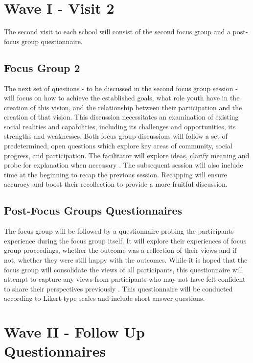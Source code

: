 \section{Wave I - Visit 2}
The second visit to each school will consist of the second focus group and a post-focus group questionnaire. 

\subsection{Focus Group 2}

The next set of questions - to be discussed in the second focus group session - will focus on how to achieve the established goals, what role youth have in the creation of this vision, and the relationship between their participation and the creation of that vision. This discussion necessitates an examination of existing social realities and capabilities, including its challenges and opportunities, its strengths and weaknesses. Both focus group discussions will follow a set of predetermined, open questions which explore key areas of community, social progress, and participation. The facilitator will explore ideas, clarify meaning and probe for explanation when necessary \citep{Gibson2007}. The subsequent session will also include time at the beginning to recap the previous session. Recapping will ensure accuracy and boost their recollection to provide a more fruitful discussion. 

\subsection{Post-Focus Groups Questionnaires}

The focus group will be followed by a questionnaire probing the participants experience during the focus group itself. It will explore their experiences of focus group proceedings, whether the outcome was a reflection of their views and if not, whether they were still happy with the outcomes. While it is hoped that the focus group will consolidate the views of all participants, this questionnaire will attempt to capture any views from participants who may not have felt confident to share their perspectives previously \citep{Tisdall2008}. This questionnaire will be conducted according to Likert-type scales and include short answer questions.

\section{Wave II - Follow Up Questionnaires}


